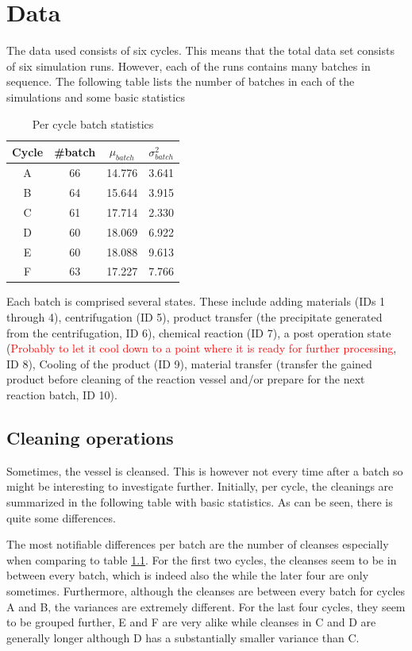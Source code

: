\documentclass[../Thesis.tex]{subfiles}
\begin{document}
\chapter{
    Data
}

The data used consists of six cycles. This means that the total data set consists of six simulation runs. However, each of the runs contains many batches in sequence. The following table lists the number of batches in each of the simulations and some basic statistics

\begin{table}[h]
    \centering
    \begin{tabular}{c|c|c|c}
        Cycle & \#batch & $\mu_{batch}$ & $\sigma^2_{batch}$\\ \hline
        A & 66 & 14.776 & 3.641\\
        B & 64 & 15.644 & 3.915\\
        C & 61 & 17.714 & 2.330\\
        D & 60 & 18.069 & 6.922\\
        E & 60 & 18.088 & 9.613\\
        F & 63 & 17.227 & 7.766
    \end{tabular}
    \caption{Per cycle batch statistics}
    \label{tab:cycle basi stats}
\end{table}

Each batch is comprised several states. These include adding materials (IDs 1 through 4), centrifugation (ID 5), product transfer (the precipitate generated from the centrifugation, ID 6), chemical reaction (ID 7), a post operation state (\textcolor{red}{Probably to let it cool down to a point where it is ready for further processing}, ID 8), Cooling of the product (ID 9), material transfer (transfer the gained product before cleaning of the reaction vessel and/or prepare for the next reaction batch, ID 10).


\section{Cleaning operations}
Sometimes, the vessel is cleansed. This is however not every time after a batch so might be interesting to investigate further. Initially, per cycle, the cleanings are summarized in the following table with basic statistics. As can be seen, there is quite some differences.

The most notifiable differences per batch are the number of cleanses especially when comparing to table \ref{tab:cycle basi stats}. For the first two cycles, the cleanses seem to be in between every batch, which is indeed also the while the later four are only sometimes. Furthermore, although the cleanses are between every batch for cycles A and B, the variances are extremely different. For the last four cycles, they seem to be grouped further, E and F are very alike while cleanses in C and D are generally longer although D has a substantially smaller variance than C.
\end{document}
